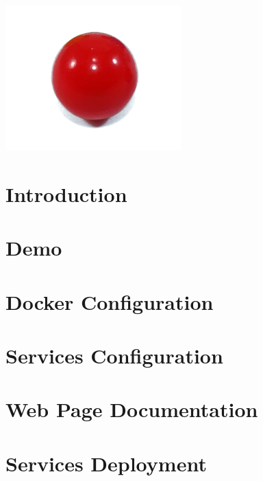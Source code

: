 \documentclass[11pt]{article}
\begin{document}
    \clearpage
    \maketitle
    \includegraphics[scale=1.5]{favicon}
    \thispagestyle{empty}

    \newpage
    \tableofcontents{}
    \thispagestyle{empty}

    \newpage
    \setcounter{page}{1}
    \section{Introduction}\label{sec:introduction}
    

    \newpage
    \section{Demo}\label{sec:Demo}
    

    \newpage
    \section{Docker Configuration}\label{sec:DockerConfiguration}
    

    \newpage
    \section{Services Configuration}\label{sec:ServicesConfiguration}
    

    \newpage
    \section{Web Page Documentation}\label{sec:Web Page Documentation}
    

    \newpage
    \section{Services Deployment}\label{sec:ServiceDeployment}
    
\end{document}
